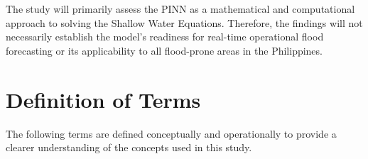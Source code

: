 The study will primarily assess the PINN as a mathematical and computational approach to solving the Shallow Water Equations. Therefore, the findings will not necessarily establish the model's readiness for real-time operational flood forecasting or its applicability to all flood-prone areas in the Philippines.

\section{Definition of Terms}



The following terms are defined conceptually and operationally to provide a clearer understanding of the concepts used in this study.


